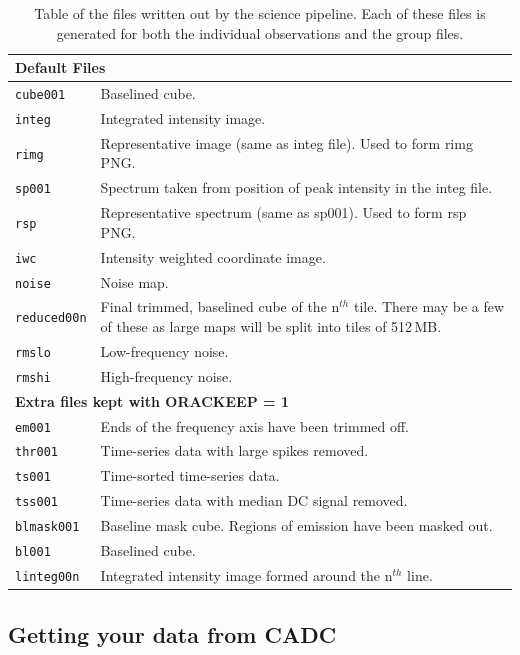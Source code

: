 \documentclass[twoside,11pt]{article}
\newcommand{\xlabel}[1]{}
\renewcommand{\_}{\texttt{\symbol{95}}}
\begin{document}
\begin{table}[h!]
\centering
\begin{tabular}{p{2.8cm}|p{11.8cm}}
\hline
\multicolumn{2}{l}{\textbf{Default Files}}\\
\hline
\texttt{cube001}& Baselined cube.\\
\texttt{integ}& Integrated intensity image. \\
\texttt{rimg}& Representative image (same as integ file). Used to form rimg PNG.\\
\texttt{sp001}& Spectrum taken from position of peak intensity in the integ file.\\
\texttt{rsp}&Representative spectrum (same as sp001). Used to form rsp PNG.\\
\texttt{iwc}& Intensity weighted coordinate image.\\
\texttt{noise}& Noise map.\\
\texttt{reduced00n}& Final trimmed, baselined cube of the n$^{th}$ tile. There may be a few of these as large maps will be split into tiles of 512\,MB.\\
\texttt{rmslo}& Low-frequency noise.\\
\texttt{rmshi}& High-frequency noise.\\
\hline
\multicolumn{2}{l}{\textbf{Extra files kept with ORAC\_KEEP = 1}}\\
\hline 
\texttt{em001}& Ends of the frequency axis have been trimmed off.\\
\texttt{thr001}& Time-series data with large spikes removed.\\
\texttt{ts001}& Time-sorted time-series data.\\
\texttt{tss001}& Time-series data with median DC signal removed.  \\
\texttt{blmask001}& Baseline mask cube. Regions of emission have been
                   masked out. \\
\texttt{bl001}& Baselined cube.\\
\texttt{linteg00n}& Integrated intensity image formed around the n$^{th}$ line. \\
\hline
\end{tabular}
\label{tab:pipe-out}
\caption{\small Table of the files written out by the science pipeline. Each of these files is generated for both the individual observations and the group files.}
\end{table}


\subsection{\xlabel{cadc}Getting your data from CADC}
\end{document}
